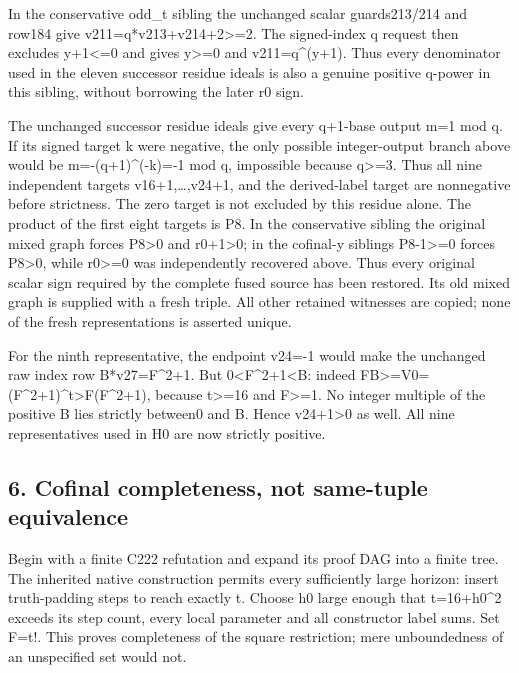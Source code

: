 In the conservative odd\_t sibling the unchanged scalar guards213/214
and row184 give v211=q*v213+v214+2\textgreater=2. The signed-index q
request then excludes y+1\textless=0 and gives y\textgreater=0 and
v211=q\^{}(y+1). Thus every denominator used in the eleven successor
residue ideals is also a genuine positive q-power in this sibling,
without borrowing the later r0 sign.

The unchanged successor residue ideals give every q+1-base output m=1
mod q. If its signed target k were negative, the only possible
integer-output branch above would be m=-(q+1)\^{}(-k)=-1 mod q,
impossible because q\textgreater=3. Thus all nine independent targets
v16+1,\ldots,v24+1, and the derived-label target are nonnegative before
strictness. The zero target is not excluded by this residue alone. The
product of the first eight targets is P8. In the conservative sibling
the original mixed graph forces P8\textgreater0 and r0+1\textgreater0;
in the cofinal-y siblings P8-1\textgreater=0 forces P8\textgreater0,
while r0\textgreater=0 was independently recovered above. Thus every
original scalar sign required by the complete fused source has been
restored. Its old mixed graph is supplied with a fresh triple. All other
retained witnesses are copied; none of the fresh representations is
asserted unique.

For the ninth representative, the endpoint v24=-1 would make the
unchanged raw index row B*v27=F\^{}2+1. But
0\textless F\^{}2+1\textless B: indeed
FB\textgreater=V0=(F\^{}2+1)\^{}t\textgreater F(F\^{}2+1), because
t\textgreater=16 and F\textgreater=1. No integer multiple of the
positive B lies strictly between0 and B. Hence v24+1\textgreater0 as
well. All nine representatives used in H0 are now strictly positive.

\subsection{6. Cofinal completeness, not same-tuple
equivalence}\label{cofinal-completeness-not-same-tuple-equivalence}

Begin with a finite C222 refutation and expand its proof DAG into a
finite tree. The inherited native construction permits every
sufficiently large horizon: insert truth-padding steps to reach exactly
t. Choose h0 large enough that t=16+h0\^{}2 exceeds its step count,
every local parameter and all constructor label sums. Set F=t!. This
proves completeness of the square restriction; mere unboundedness of an
unspecified set would not.

